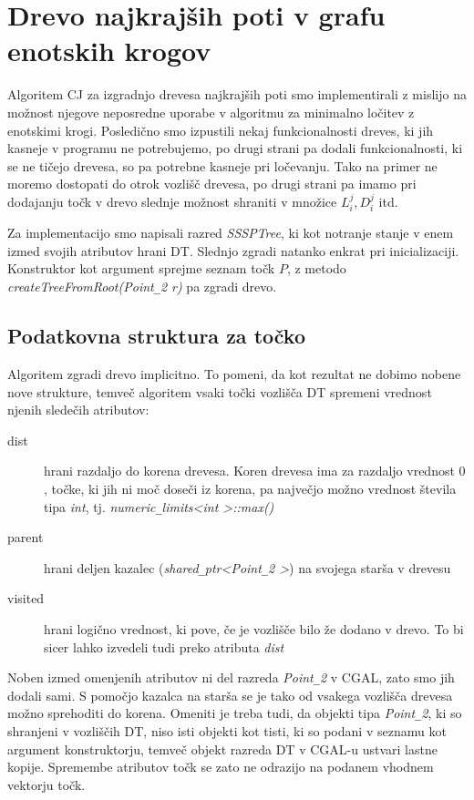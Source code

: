 \documentclass[a4paper, 12pt]{book}
\newcommand{\U}{\texttt{\_}}
\begin{document}
\section{Drevo najkrajših poti v grafu enotskih krogov}

Algoritem CJ za izgradnjo drevesa najkrajših poti smo implementirali z mislijo na možnost njegove neposredne uporabe v algoritmu za minimalno ločitev z enotskimi krogi. Posledično smo izpustili nekaj funkcionalnosti dreves, ki jih kasneje v programu ne potrebujemo, po drugi strani pa dodali funkcionalnosti, ki se ne tičejo drevesa, so pa potrebne kasneje pri ločevanju. Tako na primer ne moremo dostopati do otrok vozlišč drevesa, po drugi strani pa imamo pri dodajanju točk v drevo slednje možnost shraniti v množice $L_i^j, D_i^j$ itd.

Za implementacijo smo napisali razred \textit{SSSPTree}, ki kot notranje stanje v enem izmed svojih atributov hrani DT. Slednjo zgradi natanko enkrat pri inicializaciji. Konstruktor kot argument sprejme seznam točk $P$, z metodo \textit{createTreeFromRoot(Point\U 2 r)} pa zgradi drevo.

\subsection{Podatkovna struktura za točko}
\label{point-refs}
Algoritem zgradi drevo implicitno. To pomeni, da kot rezultat ne dobimo nobene nove strukture, temveč algoritem vsaki točki vozlišča DT spremeni vrednost njenih sledečih atributov:

\begin{description}
\item[dist] hrani razdaljo do korena drevesa. Koren drevesa ima za razdaljo vrednost $0$, točke, ki jih ni moč doseči iz korena, pa največjo možno vrednost števila tipa \textit{int}, tj. \textit{numeric\U limits\textless int \textgreater ::max()}
\item[parent] hrani deljen kazalec (\textit{shared\U ptr\textless Point\U 2 \textgreater}) na svojega starša v drevesu
\item[visited] hrani logično vrednost, ki pove, če je vozlišče bilo že dodano v drevo. To bi sicer lahko izvedeli tudi preko atributa \textit{dist}
\end{description}

Noben izmed omenjenih atributov ni del razreda \textit{Point\U 2} v CGAL, zato smo jih dodali sami. S pomočjo kazalca na starša se je tako od vsakega vozlišča drevesa možno sprehoditi do korena. Omeniti je treba tudi, da objekti tipa \textit{Point\U 2}, ki so shranjeni v vozliščih DT, niso isti objekti kot tisti, ki so podani v seznamu kot argument konstruktorju, temveč objekt razreda DT v CGAL-u ustvari lastne kopije. Spremembe atributov točk se zato ne odrazijo na podanem vhodnem vektorju točk. 
\end{document}
